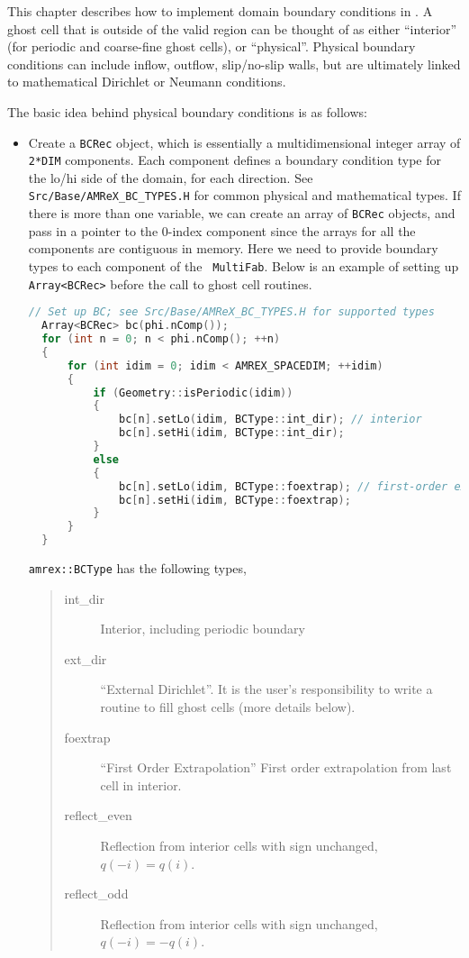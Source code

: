 This chapter describes how to implement domain boundary conditions in \amrex.
A ghost cell that is outside of the valid region can be thought of as either
``interior'' (for periodic and coarse-fine ghost cells), or ``physical''.
Physical boundary conditions can include inflow, outflow, slip/no-slip walls,
but are ultimately linked to mathematical Dirichlet or Neumann conditions.

The basic idea behind physical boundary conditions is as follows:
\begin{itemize}

\item Create a {\tt BCRec} object, which is essentially a multidimensional integer array of
{\tt 2*DIM} components.  Each component defines a boundary condition type for
the lo/hi side of the domain, for each direction.
See {\tt Src/Base/AMReX\_BC\_TYPES.H} for common physical and mathematical types.
If there is more than one variable, we can create an array of {\tt BCRec} objects,
and pass in a pointer to the 0-index component since the arrays for all the 
components are contiguous in memory.
Here we need to provide boundary types to each component of the {\tt
MultiFab}.  Below is an example of setting up {\tt Array<BCRec>}
before the call to ghost cell routines.
\begin{lstlisting}[language=cpp]
  // Set up BC; see Src/Base/AMReX_BC_TYPES.H for supported types
  Array<BCRec> bc(phi.nComp());
  for (int n = 0; n < phi.nComp(); ++n)
  {
      for (int idim = 0; idim < AMREX_SPACEDIM; ++idim)
      {
          if (Geometry::isPeriodic(idim))
          {
              bc[n].setLo(idim, BCType::int_dir); // interior
              bc[n].setHi(idim, BCType::int_dir);
          }
          else
          {
              bc[n].setLo(idim, BCType::foextrap); // first-order extrapolation
              bc[n].setHi(idim, BCType::foextrap);
          }
      }
  }
\end{lstlisting}
{\tt amrex::BCType} has the following types,
\begin{quote}
\begin{description}
\item [int\_dir] Interior, including periodic boundary
\item [ext\_dir] ``External Dirichlet''.  It is the user's responsibility to write a routine
to fill ghost cells (more details below).
\item [foextrap] ``First Order Extrapolation'' 
First order extrapolation from last cell in interior.
\item [reflect\_even] Reflection from interior cells with sign
  unchanged, $q(-i) = q(i)$.
\item [reflect\_odd] Reflection from interior cells with sign
  unchanged, $q(-i) = -q(i)$.
\end{description}
\end{quote}


\end{itemize}
